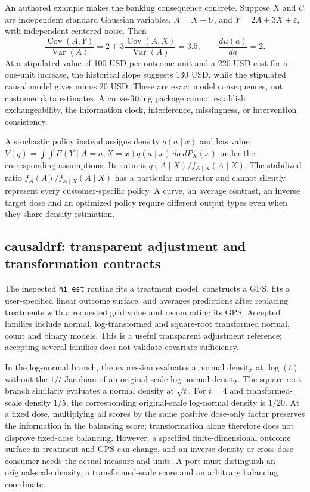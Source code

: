 An authored example makes the banking consequence concrete. Suppose $X$ and
$U$ are independent standard Gaussian variables, $A=X+U$, and
$Y=2A+3X+\varepsilon$, with independent centered noise. Then
\[
 \frac{\operatorname{Cov}(A,Y)}{\operatorname{Var}(A)}
 =2+3\frac{\operatorname{Cov}(A,X)}{\operatorname{Var}(A)}=3.5,
 \qquad \frac{d\mu(a)}{da}=2.
\]
At a stipulated value of 100 USD per outcome unit and a 220 USD cost for a
one-unit increase, the historical slope suggests 130 USD, while the stipulated
causal model gives minus 20 USD. These are exact model consequences, not customer
data estimates. A curve-fitting package cannot establish exchangeability, the
information clock, interference, missingness, or intervention consistency.
\citep{exec24_dose_contract}

A stochastic policy instead assigns density $q(a\mid x)$ and has value
$V(q)=\int\!\int E(Y\mid A=a,X=x)q(a\mid x)\,da\,dP_X(x)$ under the
corresponding assumptions. Its ratio is $q(A\mid X)/f_{A\mid X}(A\mid X)$.
The stabilized ratio $f_A(A)/f_{A\mid X}(A\mid X)$ has a particular numerator
and cannot silently represent every customer-specific policy. A curve, an
average contrast, an inverse target dose and an optimized policy require
different output types even when they share density estimation.
\citep{exec24_dose_contract}

\subsection{causaldrf: transparent adjustment and transformation contracts}
The inspected \texttt{hi\_est} routine fits a treatment model, constructs a GPS,
fits a user-specified linear outcome surface, and averages predictions after
replacing treatments with a requested grid value and recomputing its GPS.
Accepted families include normal, log-transformed and square-root transformed
normal, count and binary models. This is a useful transparent adjustment
reference; accepting several families does not validate covariate sufficiency.
\citep{exec24_dose_causaldrf}

In the log-normal branch, the expression evaluates a normal density at
$\log(t)$ without the $1/t$ Jacobian of an original-scale log-normal density.
The square-root branch similarly evaluates a normal density at $\sqrt t$.
For $t=4$ and transformed-scale density $1/5$, the corresponding original-scale
log-normal density is $1/20$. At a fixed dose, multiplying all scores by the
same positive dose-only factor preserves the information in the balancing
score; transformation alone therefore does not disprove fixed-dose balancing.
However, a specified finite-dimensional outcome surface in treatment and GPS
can change, and an inverse-density or cross-dose consumer needs the actual
measure and units. A port must distinguish an original-scale density, a
transformed-scale score and an arbitrary balancing coordinate.
\citep{exec24_dose_causaldrf,exec24_dose_contract}

